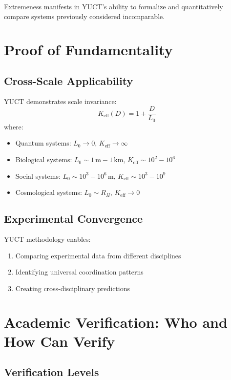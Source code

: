 \documentclass[12pt,a4paper]{article}
\begin{document}
	Extremeness manifests in YUCT's ability to formalize and quantitatively compare systems previously considered incomparable.
	
	\section{Proof of Fundamentality}
	
	\subsection{Cross-Scale Applicability}
	
	YUCT demonstrates scale invariance:
	\[
	K_{\mathrm{eff}}(D) = 1 + \frac{D}{L_0}
	\]
	where:
	\begin{itemize}
		\item Quantum systems: $L_0 \to 0$, $K_{\mathrm{eff}} \to \infty$
		\item Biological systems: $L_0 \sim 1\,\mathrm{m}-1\,\mathrm{km}$, $K_{\mathrm{eff}} \sim 10^2-10^6$
		\item Social systems: $L_0 \sim 10^3-10^6\,\mathrm{m}$, $K_{\mathrm{eff}} \sim 10^3-10^9$
		\item Cosmological systems: $L_0 \sim R_H$, $K_{\mathrm{eff}} \to 0$
	\end{itemize}
	
	\subsection{Experimental Convergence}
	
	YUCT methodology enables:
	\begin{enumerate}
		\item Comparing experimental data from different disciplines
		\item Identifying universal coordination patterns
		\item Creating cross-disciplinary predictions
	\end{enumerate}
	
	\section{Academic Verification: Who and How Can Verify}
	
	\subsection{Verification Levels}
	
\end{document}

